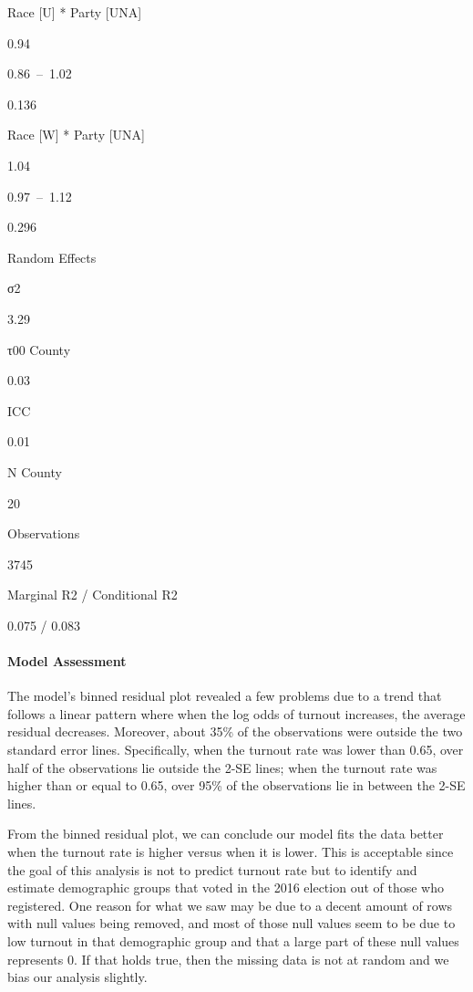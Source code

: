 \documentclass[
]{article}
\begin{document}
Race {[}U{]} * Party {[}UNA{]}

0.94

0.86~--~1.02

0.136

Race {[}W{]} * Party {[}UNA{]}

1.04

0.97~--~1.12

0.296

Random Effects

σ2

3.29

τ00 County

0.03

ICC

0.01

N County

20

Observations

3745

Marginal R2 / Conditional R2

0.075 / 0.083

\hypertarget{model-assessment}{%
\paragraph{Model Assessment}\label{model-assessment}}

The model's binned residual plot revealed a few problems due to a trend
that follows a linear pattern where when the log odds of turnout
increases, the average residual decreases. Moreover, about 35\% of the
observations were outside the two standard error lines. Specifically,
when the turnout rate was lower than 0.65, over half of the observations
lie outside the 2-SE lines; when the turnout rate was higher than or
equal to 0.65, over 95\% of the observations lie in between the 2-SE
lines.

From the binned residual plot, we can conclude our model fits the data
better when the turnout rate is higher versus when it is lower. This is
acceptable since the goal of this analysis is not to predict turnout
rate but to identify and estimate demographic groups that voted in the
2016 election out of those who registered. One reason for what we saw
may be due to a decent amount of rows with null values being removed,
and most of those null values seem to be due to low turnout in that
demographic group and that a large part of these null values represents
0. If that holds true, then the missing data is not at random and we
bias our analysis slightly.
\end{document}
